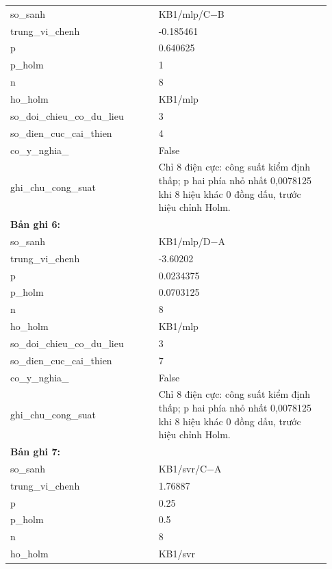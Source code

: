 \begin{longtable}{p{0.43\linewidth}p{0.50\linewidth}}
so\_\allowbreak sanh & KB1/mlp/C−B \\
trung\_\allowbreak vi\_\allowbreak chenh & -0.185461 \\
p & 0.640625 \\
p\_\allowbreak holm & 1 \\
n & 8 \\
ho\_\allowbreak holm & KB1/mlp \\
so\_\allowbreak doi\_\allowbreak chieu\_\allowbreak co\_\allowbreak du\_\allowbreak lieu & 3 \\
so\_\allowbreak dien\_\allowbreak cuc\_\allowbreak cai\_\allowbreak thien & 4 \\
co\_\allowbreak y\_\allowbreak nghia\_\allowbreak 005 & False \\
ghi\_\allowbreak chu\_\allowbreak cong\_\allowbreak suat & Chỉ 8 điện cực: công suất kiểm định thấp; p hai phía nhỏ nhất 0,0078125 khi 8 hiệu khác 0 đồng dấu, trước hiệu chỉnh Holm. \\
\midrule
\multicolumn{2}{p{0.95\linewidth}}{\textbf{Bản ghi 6: }} \\
so\_\allowbreak sanh & KB1/mlp/D−A \\
trung\_\allowbreak vi\_\allowbreak chenh & -3.60202 \\
p & 0.0234375 \\
p\_\allowbreak holm & 0.0703125 \\
n & 8 \\
ho\_\allowbreak holm & KB1/mlp \\
so\_\allowbreak doi\_\allowbreak chieu\_\allowbreak co\_\allowbreak du\_\allowbreak lieu & 3 \\
so\_\allowbreak dien\_\allowbreak cuc\_\allowbreak cai\_\allowbreak thien & 7 \\
co\_\allowbreak y\_\allowbreak nghia\_\allowbreak 005 & False \\
ghi\_\allowbreak chu\_\allowbreak cong\_\allowbreak suat & Chỉ 8 điện cực: công suất kiểm định thấp; p hai phía nhỏ nhất 0,0078125 khi 8 hiệu khác 0 đồng dấu, trước hiệu chỉnh Holm. \\
\midrule
\multicolumn{2}{p{0.95\linewidth}}{\textbf{Bản ghi 7: }} \\
so\_\allowbreak sanh & KB1/svr/C−A \\
trung\_\allowbreak vi\_\allowbreak chenh & 1.76887 \\
p & 0.25 \\
p\_\allowbreak holm & 0.5 \\
n & 8 \\
ho\_\allowbreak holm & KB1/svr \\

\end{longtable}
